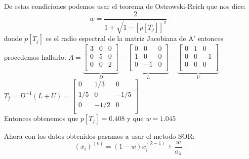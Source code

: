 \begin{frame}
    \begin{solution}
       De estas condiciones podemos usar el teorema de Ostrowski-Reich que nos dice:
        \begin{equation*}
            w=\frac{2}{1+\sqrt{1-[p[T_{j}]]^{2}}}
        \end{equation*}
        donde \begin{math}
            p[T_{j}]
        \end{math}
        es el radio espectral de la matriz Jacobiana de A'
    entonces procedemos hallarlo:
        \begin{math}
          A=  
        \underbrace{ \begin{bmatrix}
        3 & 0 & 0 \\
        0 & 5 & 0 \\
        0 & 0 & 2 \\
        \end{bmatrix}}_{\displaystyle D}
        -
        \underbrace{\begin{bmatrix}
        0 & 0 & 0 \\
        1 & 0 & 0 \\
        0 & -1 & 0 \\
        \end{bmatrix}}_{\displaystyle L}
        -
        \underbrace{\begin{bmatrix}
        0 & 1 & 0 \\
        0 & 0 & -1 \\
        0 & 0 & 0 \\
        \end{bmatrix}}_{\displaystyle U}
        
        \end{math} 
        \begin{math}
            T_{j}=D^{-1}(L+U)
        =\begin{bmatrix}
            0 & 1/3 & 0 \\
            1/5 & 0 & -1/5 \\
            0 & -1/2 & 0 \\
            \end{bmatrix}
        \end{math}
        \\Entonces obtenemos que
        \begin{math}
            p[T_{j}]=0.408
        \end{math} 
        y que 
        \begin{math}
            w=1.045
        \end{math}
        
    \end{solution}
\end{frame}

\begin{frame}

    \begin{solution}
      Ahora con los datos obtenidos pasamos a usar el metodo SOR:
      \begin{equation}
          (x_{i})^(k)=(1-w) x_{i}^(k-1)+\frac{w}{a_{ii}}
      \end{equation}
    \end{solution}
    
\end{frame}